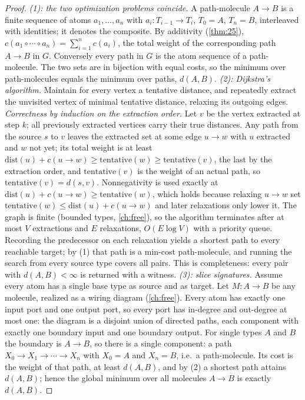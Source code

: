 \begin{proof}
\emph{(1): the two optimization problems coincide.} A path-molecule $A \to B$
is a finite sequence of atoms $a_1, \dots, a_n$ with $a_i \colon T_{i-1} \to
T_i$, $T_0 = A$, $T_n = B$, interleaved with identities; it denotes the
composite. By additivity (\autoref{thm:25}),
$c (a_1 \circ \cdots \circ a_n) = \sum_{i=1}^{n} c (a_i)$, the total weight of
the corresponding path $A \to B$ in $G$. Conversely every path in $G$ is the
atom sequence of a path-molecule. The two sets are in bijection with equal
costs, so the minimum over path-molecules equals the minimum over paths,
$d (A,B)$.
\emph{(2): Dijkstra's algorithm.} Maintain for every vertex a tentative
distance, and repeatedly extract the unvisited vertex of minimal tentative
distance, relaxing its outgoing edges. \emph{Correctness by induction on the
extraction order.} Let $v$ be the vertex extracted at step $k$; all previously
extracted vertices carry their true distances. Any path from the source $s$ to
$v$ leaves the extracted set at some edge $u \to w$ with $u$ extracted and $w$
not yet; its total weight is at least
$\mathrm{dist} (u) + c (u \to w) \ge \mathrm{tentative} (w) \ge
\mathrm{tentative} (v)$, the last by the extraction order, and
$\mathrm{tentative} (v)$ is the weight of an actual path, so
$\mathrm{tentative} (v) = d (s, v)$. Nonnegativity is used exactly at
$\mathrm{dist} (u) + c (u \to w) \ge \mathrm{tentative} (w)$, which holds because
relaxing $u \to w$ set $\mathrm{tentative} (w) \le \mathrm{dist} (u) + c (u \to
w)$ and later relaxations only lower it. The graph is finite (bounded types,
\autoref{ch:free}), so the algorithm terminates after at most $V$ extractions
and $E$ relaxations, $O (E \log V)$ with a priority queue. Recording the
predecessor on each relaxation yields a shortest path to every reachable
target; by (1) that path is a min-cost path-molecule, and running the search
from every source type covers all pairs. This is completeness: every pair with
$d (A,B) < \infty$ is returned with a witness.
\emph{(3): slice signatures.} Assume every atom has a single base type as
source and as target. Let $M \colon A \to B$ be any molecule, realized as a
wiring diagram (\autoref{ch:free}). Every atom has exactly one input port and
one output port, so every port has in-degree and out-degree at most one: the
diagram is a disjoint union of directed paths, each component with exactly one
boundary input and one boundary output. For single types $A$ and $B$ the
boundary is $A \to B$, so there is a single component: a path
$X_0 \to X_1 \to \cdots \to X_n$ with $X_0 = A$ and $X_n = B$, i.e.\ a
path-molecule. Its cost is the weight of that path, at least $d (A,B)$, and by
(2) a shortest path attains $d (A,B)$; hence the global minimum over all
molecules $A \to B$ is exactly $d (A,B)$.
\end{proof}

